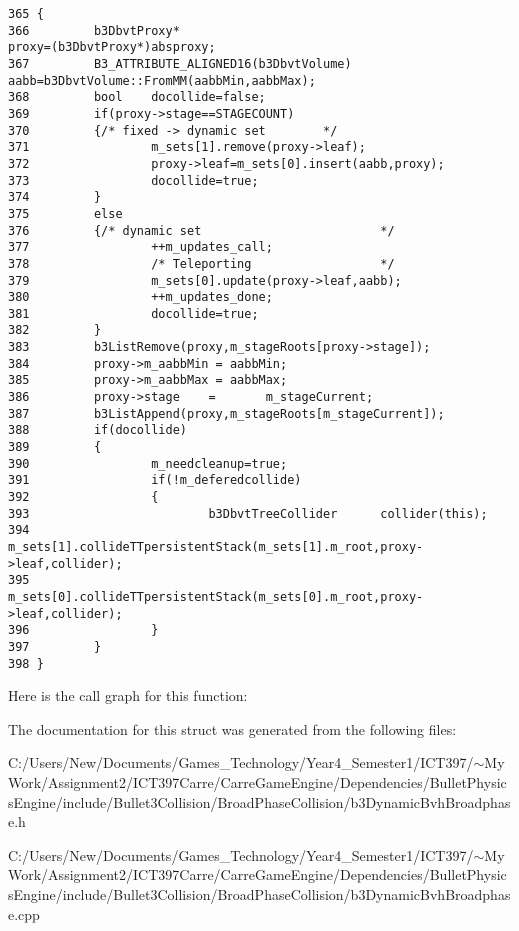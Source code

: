 \begin{Code}\begin{verbatim}365 {
366         b3DbvtProxy*                                            proxy=(b3DbvtProxy*)absproxy;
367         B3_ATTRIBUTE_ALIGNED16(b3DbvtVolume)    aabb=b3DbvtVolume::FromMM(aabbMin,aabbMax);
368         bool    docollide=false;
369         if(proxy->stage==STAGECOUNT)
370         {/* fixed -> dynamic set        */ 
371                 m_sets[1].remove(proxy->leaf);
372                 proxy->leaf=m_sets[0].insert(aabb,proxy);
373                 docollide=true;
374         }
375         else
376         {/* dynamic set                         */ 
377                 ++m_updates_call;
378                 /* Teleporting                  */ 
379                 m_sets[0].update(proxy->leaf,aabb);
380                 ++m_updates_done;
381                 docollide=true;
382         }
383         b3ListRemove(proxy,m_stageRoots[proxy->stage]);
384         proxy->m_aabbMin = aabbMin;
385         proxy->m_aabbMax = aabbMax;
386         proxy->stage    =       m_stageCurrent;
387         b3ListAppend(proxy,m_stageRoots[m_stageCurrent]);
388         if(docollide)
389         {
390                 m_needcleanup=true;
391                 if(!m_deferedcollide)
392                 {
393                         b3DbvtTreeCollider      collider(this);
394                         m_sets[1].collideTTpersistentStack(m_sets[1].m_root,proxy->leaf,collider);
395                         m_sets[0].collideTTpersistentStack(m_sets[0].m_root,proxy->leaf,collider);
396                 }
397         }       
398 }
\end{verbatim}
\end{Code}




Here is the call graph for this function:

The documentation for this struct was generated from the following files:\begin{CompactItemize}
\item 
C:/Users/New/Documents/Games\_\-Technology/Year4\_\-Semester1/ICT397/$\sim$My Work/Assignment2/ICT397Carre/CarreGameEngine/Dependencies/BulletPhysicsEngine/include/Bullet3Collision/BroadPhaseCollision/b3DynamicBvhBroadphase.h\item 
C:/Users/New/Documents/Games\_\-Technology/Year4\_\-Semester1/ICT397/$\sim$My Work/Assignment2/ICT397Carre/CarreGameEngine/Dependencies/BulletPhysicsEngine/include/Bullet3Collision/BroadPhaseCollision/b3DynamicBvhBroadphase.cpp\end{CompactItemize}
